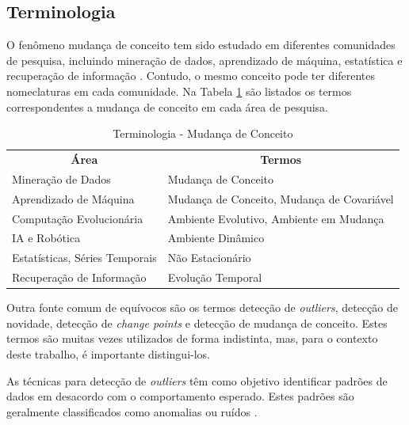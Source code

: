 \documentclass[qual, classic, a4paper]{ufbathesis}
\begin{document}
\subsection{Terminologia}

O fenômeno mudança de conceito tem sido estudado em diferentes comunidades de pesquisa, incluindo mineração de dados, 
aprendizado de máquina, estatística e recuperação de informação \cite{Zliobaite:2010}.
Contudo, o mesmo conceito pode ter diferentes nomeclaturas em cada comunidade.
Na Tabela \ref{tbl:taxonomy} são listados os termos correspondentes a mudança de conceito em cada área de pesquisa.

\begin{center} 
\begin{table}[H]
\label{tbl:taxonomy}
\begin{tabularx}{\textwidth}{|l|X|}
\cline{1-2}
\multicolumn{1}{|c|}{\textbf{Área}} & \multicolumn{1}{c|}{\textbf{Termos}}       \\ \cline{1-2}
Mineração de Dados                  & Mudança de Conceito                        \\ \cline{1-2}
Aprendizado de Máquina              & Mudança de Conceito, Mudança de Covariável \\ \cline{1-2}
Computação Evolucionária            & Ambiente Evolutivo, Ambiente em Mudança    \\ \cline{1-2}
IA e Robótica                       & Ambiente Dinâmico                          \\ \cline{1-2}
Estatísticas, Séries Temporais      & Não Estacionário                           \\ \cline{1-2}
Recuperação de Informação           & Evolução Temporal                          \\ \cline{1-2}
\end{tabularx}
\caption{Terminologia - Mudança de Conceito \cite{Zliobaite:2010}}
\end{table}
\end{center}

Outra fonte comum de equívocos são os termos detecção de \textit{outliers}, detecção de novidade, detecção de \textit{change points} e detecção de mudança de conceito.
Estes termos são muitas vezes utilizados de forma indistinta, mas, para o contexto deste trabalho, é importante distingui-los.

As técnicas para detecção de \textit{outliers} têm como objetivo identificar padrões de dados em desacordo com o comportamento esperado. Estes padrões são geralmente classificados como anomalias ou ruídos \cite{Chandola:2009:ADS:1541880.1541882}.
\end{document}
